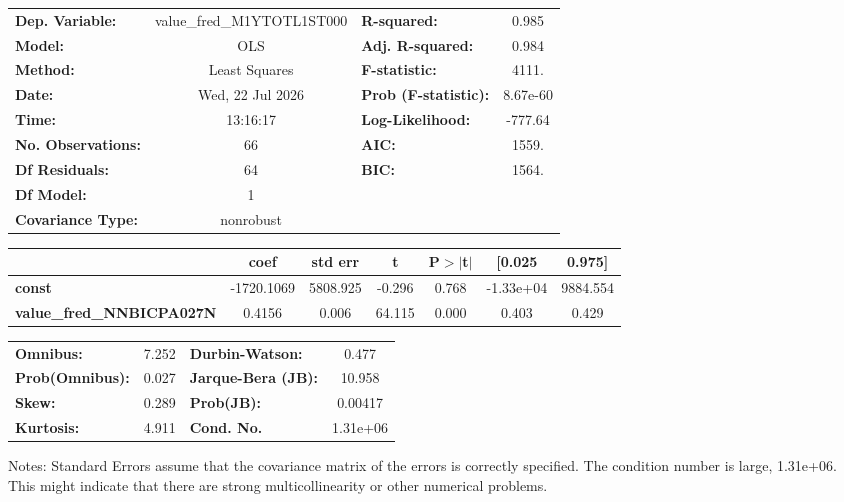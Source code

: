 \begin{center}
\begin{tabular}{lclc}
\toprule
\textbf{Dep. Variable:}           & value\_fred\_M1YTOTL1ST000 & \textbf{  R-squared:         } &     0.985   \\
\textbf{Model:}                   &            OLS             & \textbf{  Adj. R-squared:    } &     0.984   \\
\textbf{Method:}                  &       Least Squares        & \textbf{  F-statistic:       } &     4111.   \\
\textbf{Date:}                    &      Wed, 22 Jul 2026      & \textbf{  Prob (F-statistic):} &  8.67e-60   \\
\textbf{Time:}                    &          13:16:17          & \textbf{  Log-Likelihood:    } &   -777.64   \\
\textbf{No. Observations:}        &               66           & \textbf{  AIC:               } &     1559.   \\
\textbf{Df Residuals:}            &               64           & \textbf{  BIC:               } &     1564.   \\
\textbf{Df Model:}                &                1           & \textbf{                     } &             \\
\textbf{Covariance Type:}         &         nonrobust          & \textbf{                     } &             \\
\bottomrule
\end{tabular}
\begin{tabular}{lcccccc}
                                  & \textbf{coef} & \textbf{std err} & \textbf{t} & \textbf{P$> |$t$|$} & \textbf{[0.025} & \textbf{0.975]}  \\
\midrule
\textbf{const}                    &   -1720.1069  &     5808.925     &    -0.296  &         0.768        &    -1.33e+04    &     9884.554     \\
\textbf{value\_fred\_NNBICPA027N} &       0.4156  &        0.006     &    64.115  &         0.000        &        0.403    &        0.429     \\
\bottomrule
\end{tabular}
\begin{tabular}{lclc}
\textbf{Omnibus:}       &  7.252 & \textbf{  Durbin-Watson:     } &    0.477  \\
\textbf{Prob(Omnibus):} &  0.027 & \textbf{  Jarque-Bera (JB):  } &   10.958  \\
\textbf{Skew:}          &  0.289 & \textbf{  Prob(JB):          } &  0.00417  \\
\textbf{Kurtosis:}      &  4.911 & \textbf{  Cond. No.          } & 1.31e+06  \\
\bottomrule
\end{tabular}
\end{center}

Notes: \newline
 [1] Standard Errors assume that the covariance matrix of the errors is correctly specified. \newline
 [2] The condition number is large, 1.31e+06. This might indicate that there are \newline
 strong multicollinearity or other numerical problems.